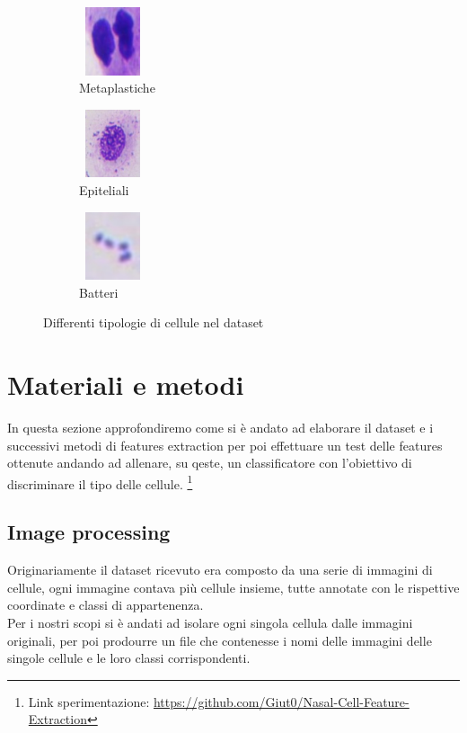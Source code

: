 \documentclass[italian,10pt,a4paper]{article}
\begin{document}
\begin{figure}[h]
						\label{fig:multiple_images2}
						\begin{subfigure}[h]{70px}
							\centering
							\includegraphics[width=2cm, height=2cm]{metaplatic.jpg}
							\caption{Metaplastiche}
							\label{fig:image7}
						\end{subfigure}
						\hfill
						\begin{subfigure}[h]{70px}
							\centering
							\includegraphics[width=2cm, height=2cm]{epiteliali.jpg}
							\caption{Epiteliali}
							\label{fig:image8}
						\end{subfigure}
						\hfill
						\begin{subfigure}[h]{70px}
							\centering
							\includegraphics[width=2cm, height=2cm]{batteri.jpg}
							\caption{Batteri}
							\label{fig:image9}
						\end{subfigure}
						
						\caption{Differenti tipologie di cellule nel dataset}
						\label{fig:multiple_images3}
					\end{figure}
		
	\section{Materiali e metodi}
		In questa sezione approfondiremo come si è andato ad elaborare il dataset e i successivi metodi di features extraction per poi effettuare un test delle features ottenute andando ad allenare, su qeste, un classificatore con l'obiettivo di discriminare il tipo delle cellule. \footnote{Link sperimentazione: \href{https://github.com/Giut0/Nasal-Cell-Feature-Extraction}{https://github.com/Giut0/Nasal-Cell-Feature-Extraction}}
		
		\subsection{Image processing}
			Originariamente il dataset ricevuto era composto da una serie di immagini di cellule, ogni immagine contava più cellule insieme, tutte annotate con le rispettive coordinate e classi di appartenenza.\\
			Per i nostri scopi si è andati ad isolare ogni singola cellula dalle immagini originali, per poi prodourre un file che contenesse i nomi delle immagini delle singole cellule e le loro classi corrispondenti.
			
\end{document}
